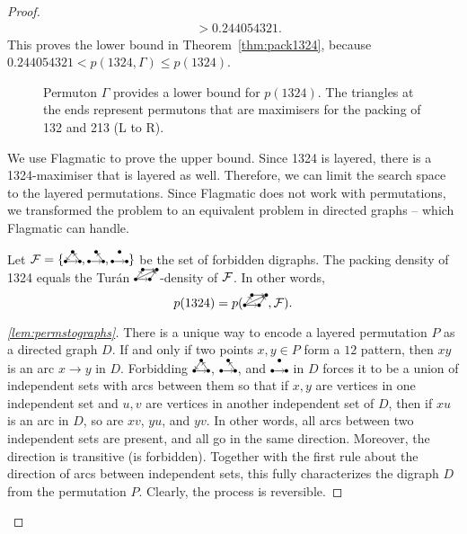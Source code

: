 \begin{proof}
\begin{align*}
& > 0.244054321.
\end{align*}
This proves the lower bound in Theorem~\ref{thm:pack1324}, because $0.244054321 < p(1324,\Gamma) \leq p(1324)$.
\begin{figure}[ht]
\centering
{}
\caption{\small{Permuton $\Gamma$ provides a lower bound for $p(1324)$. The triangles at the ends represent permutons that are maximisers for the packing of 132 and 213 (L to R).}}
\label{fig:gamma_constr}
\end{figure}

We use Flagmatic to prove the upper bound. Since 1324 is layered, there is a 1324-maximiser that is layered as well. Therefore, we can limit the search space to the layered permutations. Since Flagmatic does not work with permutations, we transformed the problem to an equivalent problem in directed graphs -- which Flagmatic can handle. 
\begin{lemma}
\label{lem:permstographs}
Let $\F = \{\dicycle, \twochain, \orcocherry\}$ be the set of forbidden digraphs.  The packing density of 1324 equals the Tur\'an $\digraphacbd$-density of $\mathcal{F}$. In other words, $$p(1324)= p(\digraphacbd, \F).$$
\end{lemma}
\begin{proof}[\ref{lem:permstographs}]
There is a unique way to encode a layered permutation $P$ as a directed graph $D$. If and only if two points $x,y \in P$ form a $12$ pattern, then $xy$ is an arc $x \to y$ in $D$. Forbidding $\dicycle$, $\twochain$, and $\orcocherry$ in $D$ forces it to be a union of independent sets with arcs between them so that if $x,y$ are vertices in one independent set and $u,v$ are vertices in another independent set of $D$, then if $xu$ is an arc in $D$, so are $xv$, $yu$, and $yv$. In other words, all arcs between two independent sets are present, and all go in the same direction. Moreover, the direction is transitive (\dicycle is forbidden). Together with the first rule about the direction of arcs between independent sets, this fully characterizes the digraph $D$ from the permutation $P$. Clearly, the process is reversible.
\end{proof}


\end{proof}
